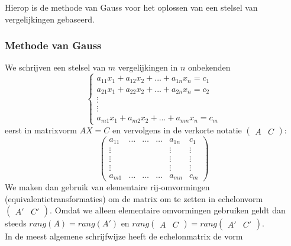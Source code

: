 Hierop is de methode van Gauss voor het oplossen van een stelsel van vergelijkingen gebaseerd.

\subsubsection{Methode van Gauss}

We schrijven een stelsel van $m$ vergelijkingen in $n$ onbekenden 
\[ 
\left\{ \begin{array}{l}
a_{11} x_1 + a_{12} x_2 + ... + a_{1n} x_n = c_1 \\
a_{21} x_1 + a_{22} x_2 + ... + a_{2n} x_n = c_2 \\
\vdots \\ \vdots \\
a_{m1} x_1 + a_{m2} x_2 + ... + a_{mn} x_n = c_m
\end{array}
\right.
\]
eerst in matrixvorm $AX=C$ en vervolgens in de verkorte notatie $\left( \begin{array}{c|c} A & C \end{array} \right)$:
\[
\left( 
\begin{array}{ccccc|c}
a_{11} & \ldots & \ldots & \ldots & a_{1n} & c_1 \\ \vdots & & & & \vdots & \vdots \\ \vdots & & & & \vdots & \vdots \\ \vdots & & & & \vdots & \vdots \\ a_{m1} & \ldots & \ldots & \ldots & a_{mn} & c_m
\end{array} 
\right)
\]
We maken dan gebruik van elementaire rij-omvormingen (equivalentietransformaties) om de matrix om te zetten in echelonvorm $\left( \begin{array}{c|c} A' & C' \end{array} \right)$. Omdat we alleen elementaire omvormingen gebruiken geldt dan steeds $rang(A)=rang(A')$ en $rang \left( \begin{array}{c|c} A & C \end{array} \right) = rang \left( \begin{array}{c|c} A' & C' \end{array} \right)$.\\
In de meest algemene schrijfwijze heeft de echelonmatrix de vorm
